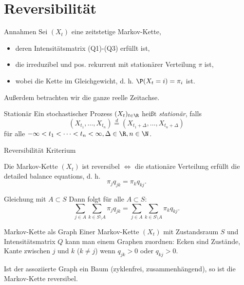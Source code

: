 \section{Reversibilität}

\begin{karte}{Annahmen}
    Sei \((X_t)\) eine zeitstetige Markov-Kette,
    \begin{itemize}
        \item deren Intensitätsmatrix (Q1)-(Q3) erfüllt ist,
        \item die irreduzibel und pos. rekurrent mit stationärer 
        Verteilung \(\pi\) ist,
        \item wobei die Kette im Gleichgewicht, 
        d. h. \(\P(X_t = i) = \pi_i\) ist.
    \end{itemize} 
    Außerdem betrachten wir die ganze reelle Zeitachse.
\end{karte}

\begin{karte}{Stationär}
    Ein stochastischer Prozess 
    \((X_t)_{t\in \R}\) heißt \textit{stationär}, 
    falls 
    \[ (X_{t_1}, \ldots, X_{t_n}) \overset{d}{=}
    (X_{t_1+\Delta}, \ldots, X_{t_n + \Delta}) \]
    für alle \(-\infty < t_1 < \cdots < t_n < \infty, 
    \Delta \in \R, n\in\N\).
\end{karte}

\begin{karte}{Reversibilität Kriterium}

    Die Markov-Kette 
    \((X_t)\) ist reversibel \(\Leftrightarrow\) 
    die stationäre Verteilung erfüllt die 
    detailed balance equations, d. h. 
    \[ \pi_j q_{jk} = \pi_k q_{kj}. \]
\end{karte}

\begin{karte}{Gleichung mit \(A\subset S\)}
    Dann folgt für alle \(A\subset S\):
    \[ \sum_{j\in A} \sum_{k\in S\setminus A} 
    \pi_j q_{jk} = 
    \sum_{j\in A} \sum_{k\in S\setminus A} 
    \pi_k q_{kj}. \]
\end{karte}

\begin{karte}{Markov-Kette als Graph}
    Einer Markov-Kette 
    \((X_t) \) mit Zustandsraum \(S\) und 
    Intensitätsmatrix \(Q\) kann man einem Graphen zuordnen: 
    Ecken sind Zustände, Kante zwischen \(j\) und \(k\)
    (\(k\neq j\)) wenn \(q_{jk} > 0\) oder \(q_{kj} > 0\).

    Ist der assoziierte Graph ein Baum (zyklenfrei, 
    zusammenhängend), so ist die Markov-Kette reversibel.
\end{karte}